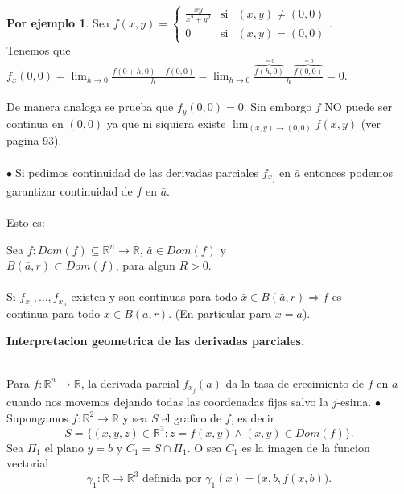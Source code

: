 \documentclass{article}
\theoremstyle{definition}
\theoremstyle{definition}
\newtheorem*{ej}{Por ejemplo}
\theoremstyle{remark}
\newcommand\bl{$\bullet\;$}
\begin{document}
\begin{ej}
  Sea $f(x,y) = \left\{\begin{array}{ccl}
      \frac{xy}{x^2+y^2} & \text{si} & (x,y) \neq (0,0) \\
      0 & \text{si} & (x,y)=(0,0)
  \end{array}\right..$ \\
  Tenemos que $f_x(0,0)=\lim_{h \to 0}{\frac{f(0+h,0)-f(0,0)}{h}}=\lim_{h \to 0}{\frac{\overbrace{f(h,0)}^{= 0}-\overbrace{f(0,0)}^{= 0}}{h}}=0.$\\\\ De manera analoga se prueba que $f_y(0,0)=0$. Sin embargo $f$ NO puede ser continua en $(0,0)$ ya que ni siquiera existe $\lim_{(x,y) \to (0,0)}{f(x,y)}$ \quad (ver pagina 93). \\\\ 
  \bl Si pedimos continuidad de las derivadas parciales $f_{x_j}$ en $\bar{a}$ entonces podemos garantizar continuidad de $f$ en $\bar{a}$. \\\\ Esto es: 
\end{ej}
\begin{teo}
  Sea $f:Dom(f) \subseteq \mathbb{R}^n \to \mathbb{R}$, $\bar{a} \in Dom(f)$ y \\ $B(\bar{a},r) \subset Dom(f)$, para algun $R>0$. \\\\ Si $f_{x_1}, \dots, f_{x_n}$ existen y son continuas para todo $\bar{x} \in B(\bar{a},r) \Rightarrow f$ es\\ continua para todo $\bar{x} \in B(\bar{a},r).$ \quad (En particular para $\bar{x}=\bar{a}$).
\end{teo}
\pagebreak
\begin{center}
\textbf{Interpretacion geometrica de las derivadas parciales.}
\end{center}
\begin{figure}[h]
\centering
\def\svgwidth{1\textwidth}

\end{figure} \; \\
Para $f : \mathbb{R}^n \to \mathbb{R}$, la derivada parcial $f_{x_j}(\bar{a})$ da la tasa de crecimiento de $f$ en $\bar{a}$ cuando nos movemos dejando todas las coordenadas fijas salvo la $j$-esima.
\pagebreak
\textcolor{rojop2}{\bl} Supongamos $f : \mathbb{R}^2 \to \mathbb{R}$ y sea $S$ el grafico de $f$, es decir \[
  S= \big\{(x,y,z) \in \mathbb{R}^3 : z=f(x,y) \land (x,y) \in Dom(f)\big\}.
\] 
Sea $\Pi_1$ el plano $y=b$ \; y \; $C_1=S \cap \Pi_1$. O sea $C_1$ es la imagen de la funcion vectorial \[ 
  \gamma_1 : \mathbb{R} \to \mathbb{R}^3 \text{ definida por } \gamma_1(x) = \big(x,b,f(x,b)\big).
\] 
\end{document}
